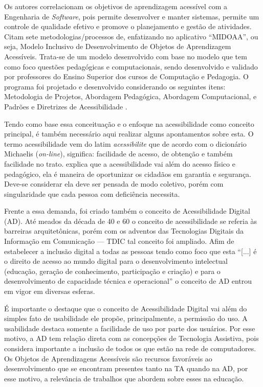 \documentclass[portuguese]{textolivre}
\begin{document}
Os autores correlacionam os objetivos de aprendizagem acessível com a
Engenharia de \emph{Software}, pois permite desenvolver e manter
sistemas, permite um controle de qualidade efetivo e promove o
planejamento e gestão de atividades. Citam sete metodologias/processos
de, enfatizando no aplicativo ``MIDOAA'', ou seja, Modelo Inclusivo de
Desenvolvimento de Objetos de Aprendizagem Acessíveis. Trata-se de um
modelo desenvolvido com base no modelo que tem como foco questões
pedagógicas e computacionais, sendo desenvolvido e validado por
professores do Ensino Superior dos cursos de Computação e Pedagogia. O
programa foi projetado e desenvolvido considerando os seguintes itens:
Metodologia de Projetos, Abordagem Pedagógica, Abordagem Computacional,
e Padrões e Diretrizes de Acessibilidade \cite{mourao2020}.

Tendo como base essa conceituação e o enfoque na acessibilidade como
conceito principal, é também necessário aqui realizar alguns
apontamentos sobre esta. O termo acessibilidade vem do latim
\emph{acessibilite} que de acordo com o dicionário Michaelis
(\emph{on-line}), significa: facilidade de acesso, de obtenção e também
facilidade no trato. \textcite{sassaki2009} explica que a acessibilidade vai
além do acesso físico e pedagógico, ela é maneira de oportunizar os
cidadãos em garantia e segurança. Deve-se considerar ela deve ser
pensada de modo coletivo, porém com singularidade que cada pessoa com
deficiência necessita.

Frente a essa demanda, foi criado
também o conceito de Acessibilidade Digital (AD). Até meados da década
de 40 e 60 o conceito de acessibilidade se referia às barreiras
arquitetônicas, porém com os adventos das Tecnologias Digitais da
Informação em Comunicação --- TDIC tal conceito foi ampliado. Afim de
estabelecer a inclusão digital a todas as pessoas tendo como foco que
esta ``{[}...{]} é o direito de acesso ao mundo digital para o
desenvolvimento intelectual (educação, geração de conhecimento,
participação e criação) e para o desenvolvimento de capacidade técnica e
operacional'' \cite[p.~215]{passerino2007} o conceito de AD entrou em
vigor em diversas esferas.

É importante o destaque que o conceito de Acessibilidade Digital vai
além do simples fato de usabilidade ele propõe, principalmente, a
permissão do uso. A usabilidade destaca somente a facilidade de uso por
parte dos usuários. Por esse motivo, a AD tem relação direta com as
concepções de Tecnologia Assistiva, pois considera importante a inclusão
de todos os que estão na rede de computadores. Os Objetos de
Aprendizagens Acessíveis são recursos favoráveis ao desenvolvimento que
se encontram presentes tanto na TA quando na AD, por esse motivo, a
relevância de trabalhos que abordem sobre esses na educação.
\end{document}
